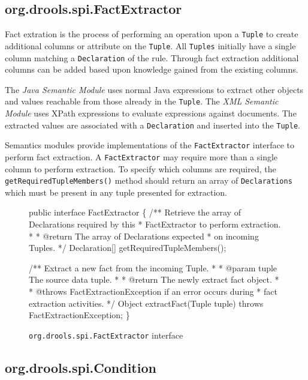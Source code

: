 \subsection{org.drools.spi.FactExtractor}

Fact extration is the process of performing an operation upon a
\verb|Tuple| to create additional columns or attribute on the
\verb|Tuple|.  All \verb|Tuples| initially have a single column
matching a \verb|Declaration| of the rule.  Through fact
extraction additional columns can be added based upon knowledge
gained from the existing columns.

The \emph{Java Semantic Module} uses normal Java expressions to
extract other objects and values reachable from those already in the
\verb|Tuple|.  The \emph{XML Semantic Module} uses
XPath\cite{clark99xpath} expressions
to evaluate expressions against documents.  The extracted values are
associated with a \verb|Declaration| and inserted into the
\verb|Tuple|.

Semantics modules provide implementations of the \verb|FactExtractor|
interface to perform fact extraction. A \verb|FactExtractor| may
require more than a single column to perform extraction.  To specify
which columns are required, the \verb|getRequiredTupleMembers()| 
method should return an array of \verb|Declarations| which must 
be present in any tuple presented for extraction.

\begin{figure}
\begin{codelisting}
public interface FactExtractor
\{
    /** Retrieve the array of Declarations required by this 
     *  FactExtractor to perform extraction.
     *
     *  @return The array of Declarations expected 
     *          on incoming Tuples.
     */
    Declaration[] getRequiredTupleMembers();

    /** Extract a new fact from the incoming Tuple.
     *
     *  @param tuple The source data tuple.
     *
     *  @return The newly extract fact object.
     *
     *  @throws FactExtractionException if an error occurs during
     *          fact extraction activities.
     */
    Object extractFact(Tuple tuple) throws FactExtractionException;
\}
\end{codelisting}
\label{code.FactExtractor}
\caption{\texttt{org.drools.spi.FactExtractor} interface}
\end{figure}

\subsection{org.drools.spi.Condition}

